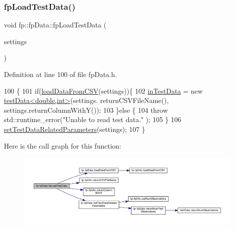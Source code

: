 \subsubsection{\texorpdfstring{fp\+Load\+Test\+Data()}{fpLoadTestData()}}
{\footnotesize\ttfamily void fp\+::fp\+Data\+::fp\+Load\+Test\+Data (\begin{DoxyParamCaption}\item[{\hyperlink{classfp_1_1fpInfo}{fp\+Info} \&}]{settings }\end{DoxyParamCaption})\hspace{0.3cm}{\ttfamily [inline]}}



Definition at line 100 of file fp\+Data.\+h.


\begin{DoxyCode}
100                                                  \{
101                 \textcolor{keywordflow}{if}(\hyperlink{classfp_1_1fpData_a2b4d9be328aaa7acf9a2561150da0402}{loadDataFromCSV}(settings))\{
102                     \hyperlink{classfp_1_1fpData_ad4f4dd3a8d15633b7f983932fa60bbad}{inTestData} = \textcolor{keyword}{new} \hyperlink{classtestData}{testData<double,int>}(settings.
      returnCSVFileName(), settings.returnColumnWithY());
103                 \}\textcolor{keywordflow}{else} \{
104                     \textcolor{keywordflow}{throw} std::runtime\_error(\textcolor{stringliteral}{"Unable to read test data."} );
105                 \}
106                 \hyperlink{classfp_1_1fpData_ab60d2098334e253a0bf3115f029c1996}{setTestDataRelatedParameters}(settings);
107             \}
\end{DoxyCode}
Here is the call graph for this function\+:\nopagebreak
\begin{figure}[H]
\begin{center}
\leavevmode
\includegraphics[width=350pt]{classfp_1_1fpData_a4b527bc84762c4708992b7fdce3d0602_cgraph}
\end{center}
\end{figure}
\mbox{\label{classfp_1_1fpData_a2b4d9be328aaa7acf9a2561150da0402}} 
